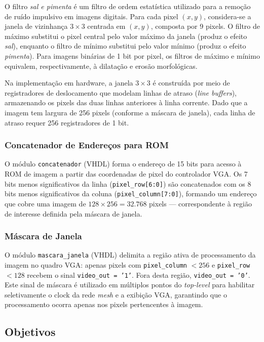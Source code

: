 \documentclass[12pt, a4paper]{article}
\begin{document}
	O filtro \textit{sal e pimenta} é um filtro de ordem estatística utilizado
	para a remoção de ruído impulsivo em imagens digitais. Para cada pixel
	$(x, y)$, considera-se a janela de vizinhança $3\times3$ centrada em $(x,y)$,
	composta por 9 pixels. O filtro de máximo substitui o pixel central pelo
	valor máximo da janela (produz o efeito \textit{sal}), enquanto o filtro de
	mínimo substitui pelo valor mínimo (produz o efeito \textit{pimenta}). Para
	imagens binárias de 1 bit por pixel, os filtros de máximo e mínimo equivalem,
	respectivamente, à dilatação e erosão morfológicas.
	
	Na implementação em hardware, a janela $3\times3$ é construída por meio de
	registradores de deslocamento que modelam linhas de atraso (\textit{line
		buffers}), armazenando os pixels das duas linhas anteriores à linha corrente.
	Dado que a imagem tem largura de 256 pixels (conforme a máscara de janela),
	cada linha de atraso requer 256 registradores de 1 bit.
	
	\subsubsection{Concatenador de Endereços para ROM}
	
	O módulo \texttt{concatenador} (VHDL) forma o endereço de 15 bits para
	acesso à ROM de imagem a partir das coordenadas de pixel do controlador VGA.
	Os 7 bits menos significativos da linha (\texttt{pixel\_row[6:0]}) são
	concatenados com os 8 bits menos significativos da coluna
	(\texttt{pixel\_column[7:0]}), formando um endereço que cobre uma imagem de
	$128 \times 256 = 32.768$ pixels --- correspondente à região de interesse
	definida pela máscara de janela.
	
	\subsubsection{Máscara de Janela}
	
	O módulo \texttt{mascara\_janela} (VHDL) delimita a região ativa de
	processamento da imagem no quadro VGA: apenas pixels com
	\texttt{pixel\_column} $< 256$ e \texttt{pixel\_row} $< 128$ recebem o sinal
	\texttt{video\_out = '1'}. Fora desta região, \texttt{video\_out = '0'}.
	Este sinal de máscara é utilizado em múltiplos pontos do \textit{top-level}
	para habilitar seletivamente o clock da rede \textit{mesh} e a exibição VGA,
	garantindo que o processamento ocorra apenas nos pixels pertencentes à imagem.
	
	\subsection{Objetivos}
	
\end{document}
